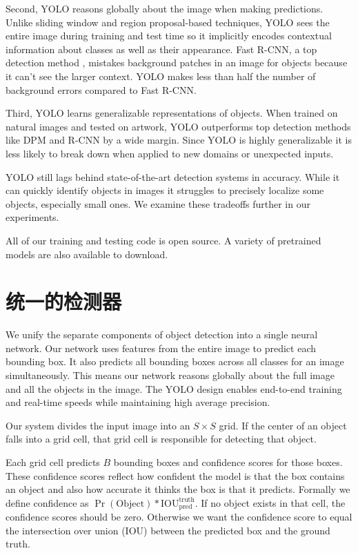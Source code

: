 \documentclass[10pt,twocolumn,letterpaper]{article}
\begin{document}
Second, YOLO reasons globally about the image when making predictions. Unlike sliding window and region proposal-based techniques, YOLO sees the entire image during training and test time so it implicitly encodes contextual information about classes as well as their appearance. Fast R-CNN, a top detection method \cite{DBLP:journals/corr/Girshick15}, mistakes background patches in an image for objects because it can't see the larger context. YOLO makes less than half the number of background errors compared to Fast R-CNN.

Third, YOLO learns generalizable representations of objects. When trained on natural images and tested on artwork, YOLO outperforms top detection methods like DPM and R-CNN by a wide margin. Since YOLO is highly generalizable it is less likely to break down when applied to new domains or unexpected inputs.

YOLO still lags behind state-of-the-art detection systems in accuracy. While it can quickly identify objects in images it struggles to precisely localize some objects, especially small ones. We examine these tradeoffs further in our experiments.

All of our training and testing code is open source.
A variety of pretrained models are also available to download.

\section{统一的检测器}

We unify the separate components of object detection into a single neural network. Our network uses features from the entire image to predict each bounding box. It also predicts all bounding boxes across all classes for an image simultaneously. This means our network reasons globally about the full image and all the objects in the image. The YOLO design enables end-to-end training and real-time speeds while maintaining high average precision.

Our system divides the input image into an $S \times S$ grid. If the center of an object falls into a grid cell, that grid cell is responsible for detecting that object.

Each grid cell predicts $B$ bounding boxes and confidence scores for those boxes. These confidence scores reflect how confident the model is that the box contains an object and also how accurate it thinks the box is that it predicts. Formally we define confidence as $\Pr(\textrm{Object}) * \textrm{IOU}_{\textrm{pred}}^{\textrm{truth}}$. If no object exists in that cell, the confidence scores should be zero. Otherwise we want the confidence score to equal the intersection over union (IOU) between the predicted box and the ground truth.
\end{document}
